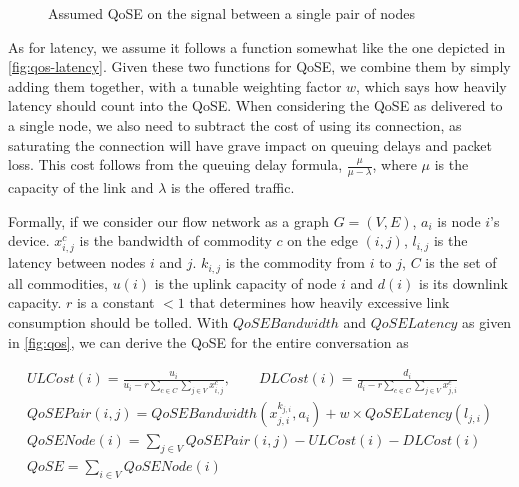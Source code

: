 \begin{figure}
\begin{subfigure}{.48\textwidth}
        \label{fig:qos-latency}
    \end{subfigure}
    \caption{Assumed QoSE on the signal between a single pair of nodes}
    \label{fig:qos}
\end{figure}

As for latency, we assume it follows a function somewhat like the one depicted in \autoref{fig:qos-latency}. Given these two functions for QoSE, we combine them by simply adding them together, with a tunable weighting factor $w$, which says how heavily latency should count into the QoSE. When considering the QoSE as delivered to a single node, we also need to subtract the cost of using its connection, as saturating the connection will have grave impact on queuing delays and packet loss. This cost follows from the queuing delay formula, $\frac{\mu}{\mu - \lambda}$, where $\mu$ is the capacity of the link and $\lambda$ is the offered traffic.

Formally, if we consider our flow network as a graph $G = (V, E)$, $a_i$ is node $i$'s device. $x^c_{i,j}$ is the bandwidth of commodity $c$ on the edge $(i,j)$, $l_{i,j}$ is the latency between nodes $i$ and $j$. $k_{i,j}$ is the commodity from $i$ to $j$, $C$ is the set of all commodities, $u(i)$ is the uplink capacity of node $i$ and $d(i)$ is its downlink capacity. $r$ is a constant $<1$ that determines how heavily excessive link consumption should be tolled. With $QoSEBandwidth$ and $QoSELatency$ as given in \autoref{fig:qos}, we can derive the QoSE for the entire conversation as

\begin{gather}\label{eq:qos-pair}
    ULCost(i) = \frac{u_i}{\displaystyle u_{i} - r\sum_{c \in C}\sum_{j \in V}x_{i, j}^{c}}, \qquad
    DLCost(i) = \frac{d_i}{\displaystyle d_{i} - r\sum_{c \in C}\sum_{j \in V}x_{j, i}^{c}} \nonumber \\
    QoSEPair(i, j) = QoSEBandwidth(x_{j, i}^{k_{j, i}}, a_i) + w \times QoSELatency(l_{j, i}) \nonumber \\
    QoSENode(i) = \sum_{j \in V} QoSEPair(i, j) - ULCost(i) - DLCost(i) \nonumber \\
    QoSE = \sum_{i \in V} QoSENode(i) \label{eq:qos}
\end{gather}


